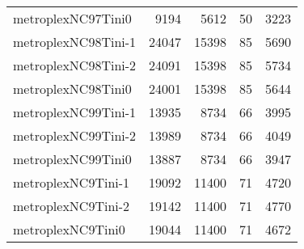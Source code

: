 \begin{longtable}{lrrrr}
metroplexNC97Tini0 & 9194 & 5612 & 50 & 3223 \\
metroplexNC98Tini-1 & 24047 & 15398 & 85 & 5690 \\
metroplexNC98Tini-2 & 24091 & 15398 & 85 & 5734 \\
metroplexNC98Tini0 & 24001 & 15398 & 85 & 5644 \\
metroplexNC99Tini-1 & 13935 & 8734 & 66 & 3995 \\
metroplexNC99Tini-2 & 13989 & 8734 & 66 & 4049 \\
metroplexNC99Tini0 & 13887 & 8734 & 66 & 3947 \\
metroplexNC9Tini-1 & 19092 & 11400 & 71 & 4720 \\
metroplexNC9Tini-2 & 19142 & 11400 & 71 & 4770 \\
metroplexNC9Tini0 & 19044 & 11400 & 71 & 4672 \\
\end{longtable}
